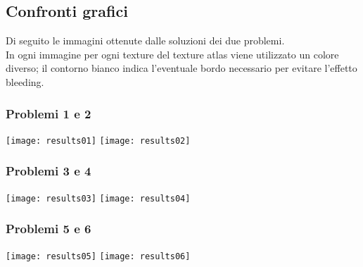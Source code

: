 \newpage

\subsection{Confronti grafici}

Di seguito le immagini ottenute dalle soluzioni dei due problemi. \\
In ogni immagine per ogni texture del texture atlas viene utilizzato un colore diverso; il contorno bianco indica l'eventuale bordo necessario per evitare l'effetto bleeding. 


\subsubsection{Problemi 1 e 2}
\begin{minipage}{\textwidth}
\centering
\texttt{[image: results01]}
\hspace{1cm}
\texttt{[image: results02]}
\end{minipage}

\subsubsection{Problemi 3 e 4}
\begin{minipage}{\textwidth}
\centering
\texttt{[image: results03]}
\hspace{1cm}
\texttt{[image: results04]}
\end{minipage}

\subsubsection{Problemi 5 e 6}
\begin{minipage}{\textwidth}
\centering
\texttt{[image: results05]}
\hspace{1cm}
\texttt{[image: results06]}
\end{minipage}






\iffalse

